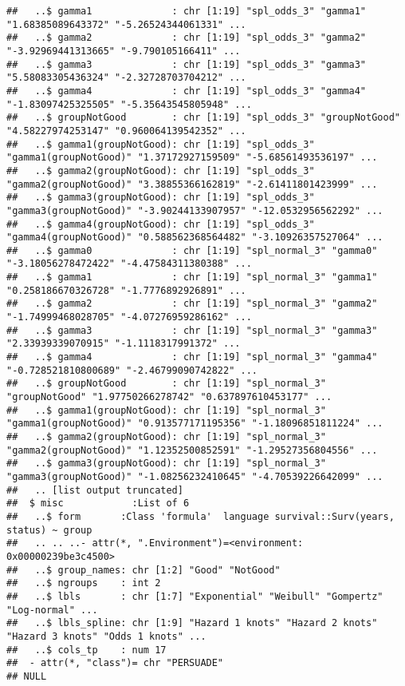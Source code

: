 \documentclass[
]{article}
\begin{document}
\begin{verbatim}
##   ..$ gamma1              : chr [1:19] "spl_odds_3" "gamma1" "1.68385089643372" "-5.26524344061331" ...
##   ..$ gamma2              : chr [1:19] "spl_odds_3" "gamma2" "-3.92969441313665" "-9.790105166411" ...
##   ..$ gamma3              : chr [1:19] "spl_odds_3" "gamma3" "5.58083305436324" "-2.32728703704212" ...
##   ..$ gamma4              : chr [1:19] "spl_odds_3" "gamma4" "-1.83097425325505" "-5.35643545805948" ...
##   ..$ groupNotGood        : chr [1:19] "spl_odds_3" "groupNotGood" "4.58227974253147" "0.960064139542352" ...
##   ..$ gamma1(groupNotGood): chr [1:19] "spl_odds_3" "gamma1(groupNotGood)" "1.37172927159509" "-5.68561493536197" ...
##   ..$ gamma2(groupNotGood): chr [1:19] "spl_odds_3" "gamma2(groupNotGood)" "3.38855366162819" "-2.61411801423999" ...
##   ..$ gamma3(groupNotGood): chr [1:19] "spl_odds_3" "gamma3(groupNotGood)" "-3.90244133907957" "-12.0532956562292" ...
##   ..$ gamma4(groupNotGood): chr [1:19] "spl_odds_3" "gamma4(groupNotGood)" "0.588562368564482" "-3.10926357527064" ...
##   ..$ gamma0              : chr [1:19] "spl_normal_3" "gamma0" "-3.18056278472422" "-4.47584311380388" ...
##   ..$ gamma1              : chr [1:19] "spl_normal_3" "gamma1" "0.258186670326728" "-1.7776892926891" ...
##   ..$ gamma2              : chr [1:19] "spl_normal_3" "gamma2" "-1.74999468028705" "-4.07276959286162" ...
##   ..$ gamma3              : chr [1:19] "spl_normal_3" "gamma3" "2.33939339070915" "-1.1118317991372" ...
##   ..$ gamma4              : chr [1:19] "spl_normal_3" "gamma4" "-0.728521810800689" "-2.46799090742822" ...
##   ..$ groupNotGood        : chr [1:19] "spl_normal_3" "groupNotGood" "1.97750266278742" "0.637897610453177" ...
##   ..$ gamma1(groupNotGood): chr [1:19] "spl_normal_3" "gamma1(groupNotGood)" "0.913577171195356" "-1.18096851811224" ...
##   ..$ gamma2(groupNotGood): chr [1:19] "spl_normal_3" "gamma2(groupNotGood)" "1.12352500852591" "-1.29527356804556" ...
##   ..$ gamma3(groupNotGood): chr [1:19] "spl_normal_3" "gamma3(groupNotGood)" "-1.08256232410645" "-4.70539226642099" ...
##   .. [list output truncated]
##  $ misc            :List of 6
##   ..$ form       :Class 'formula'  language survival::Surv(years, status) ~ group
##   .. .. ..- attr(*, ".Environment")=<environment: 0x00000239be3c4500> 
##   ..$ group_names: chr [1:2] "Good" "NotGood"
##   ..$ ngroups    : int 2
##   ..$ lbls       : chr [1:7] "Exponential" "Weibull" "Gompertz" "Log-normal" ...
##   ..$ lbls_spline: chr [1:9] "Hazard 1 knots" "Hazard 2 knots" "Hazard 3 knots" "Odds 1 knots" ...
##   ..$ cols_tp    : num 17
##  - attr(*, "class")= chr "PERSUADE"
## NULL
\end{verbatim}
\end{document}
